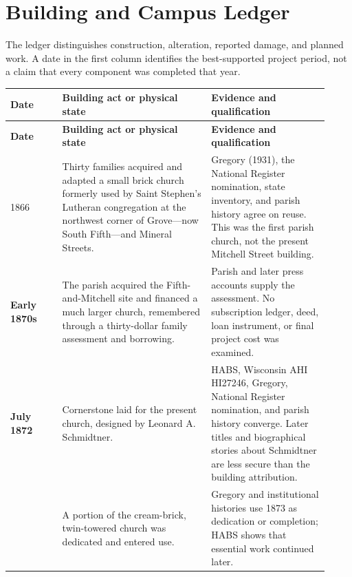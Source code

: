 \section{Building and Campus Ledger}

The ledger distinguishes construction, alteration, reported damage, and planned work. A date in the first column identifies the best-supported project period, not a claim that every component was completed that year.

\begin{longtable}{>{\bfseries\RaggedRight\arraybackslash}p{0.15\linewidth}>{\RaggedRight\arraybackslash}p{0.43\linewidth}>{\RaggedRight\arraybackslash}p{0.34\linewidth}}
\toprule
\textbf{Date} & \textbf{Building act or physical state} & \textbf{Evidence and qualification}\\
\midrule
\endfirsthead
\toprule
\textbf{Date} & \textbf{Building act or physical state} & \textbf{Evidence and qualification}\\
\midrule
\endhead
\bottomrule
\endfoot

1866 & Thirty families acquired and adapted a small brick church formerly used by Saint Stephen's Lutheran congregation at the northwest corner of Grove---now South Fifth---and Mineral Streets. & Gregory (1931), the National Register nomination, state inventory, and parish history agree on reuse. This was the first parish church, not the present Mitchell Street building.\\

Early 1870s & The parish acquired the Fifth-and-Mitchell site and financed a much larger church, remembered through a thirty-dollar family assessment and borrowing. & Parish and later press accounts supply the assessment. No subscription ledger, deed, loan instrument, or final project cost was examined.\\

July 1872 & Cornerstone laid for the present church, designed by Leonard A. Schmidtner. & HABS, Wisconsin AHI HI27246, Gregory, National Register nomination, and parish history converge. Later titles and biographical stories about Schmidtner are less secure than the building attribution.\\

1873 & A portion of the cream-brick, twin-towered church was dedicated and entered use. & Gregory and institutional histories use 1873 as dedication or completion; HABS shows that essential work continued later.\\


\end{longtable}
